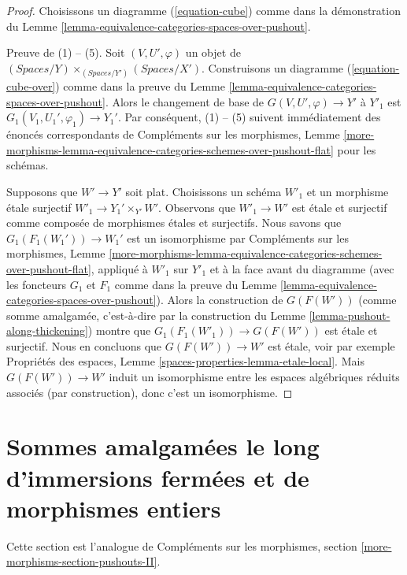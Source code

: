 \begin{proof}
Choisissons un diagramme (\ref{equation-cube}) comme dans la démonstration du
Lemme \ref{lemma-equivalence-categories-spaces-over-pushout}.

\medskip\noindent
Preuve de (1) -- (5). Soit $(V, U', \varphi)$ un objet de
$(\textit{Spaces}/Y) \times_{(\textit{Spaces}/Y')} (\textit{Spaces}/X')$.
Construisons un diagramme (\ref{equation-cube-over}) comme dans la preuve du
Lemme \ref{lemma-equivalence-categories-spaces-over-pushout}.
Alors le changement de base de $G(V, U', \varphi) \to Y'$ à
$Y'_1$ est $G_1(V_1, U_1', \varphi_1) \to Y_1'$. Par conséquent, (1) -- (5)
suivent immédiatement des énoncés correspondants de Compléments sur les morphismes, Lemme
\ref{more-morphisms-lemma-equivalence-categories-schemes-over-pushout-flat}
pour les schémas.

\medskip\noindent
Supposons que $W' \to Y'$ soit plat. Choisissons un schéma $W'_1$ et un morphisme \'etale surjectif $W'_1 \to Y_1' \times_{Y'} W'$. Observons que $W'_1 \to W'$ est \'etale et surjectif comme composée de morphismes \'etales et surjectifs. Nous savons que $G_1(F_1(W_1')) \to W_1'$ est un isomorphisme par Compléments sur les morphismes, Lemme \ref{more-morphisms-lemma-equivalence-categories-schemes-over-pushout-flat}, appliqué à $W'_1$ sur $Y'_1$ et à la face avant du diagramme (avec les foncteurs $G_1$ et $F_1$ comme dans la preuve du Lemme \ref{lemma-equivalence-categories-spaces-over-pushout}).
Alors la construction de $G(F(W'))$ (comme somme amalgamée, c'est-à-dire par la construction du Lemme \ref{lemma-pushout-along-thickening}) montre que $G_1(F_1(W'_1)) \to G(F(W'))$ est \'etale et surjectif. Nous en concluons que $G(F(W')) \to W'$ est \'etale, voir par exemple Propriétés des espaces, Lemme \ref{spaces-properties-lemma-etale-local}.
Mais $G(F(W')) \to W'$ induit un isomorphisme entre les espaces algébriques réduits associés (par construction), donc c'est un isomorphisme.
\end{proof}







\section{Sommes amalgamées le long d'immersions fermées et de morphismes entiers}
\label{section-pushouts-II}

\noindent
Cette section est l'analogue de
Compléments sur les morphismes, section \ref{more-morphisms-section-pushouts-II}.

